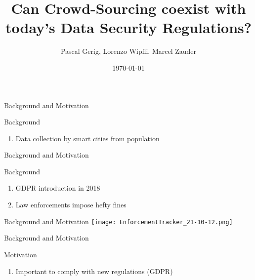 \documentclass{beamer}
\begin{document}
	\author{Pascal Gerig, Lorenzo Wipfli, Marcel Zauder}
	\title{Can Crowd-Sourcing coexist with today's Data Security Regulations?}
	\date{\today}

\begin{frame}
	\titlepage
\end{frame}



\begin{frame}{Background and Motivation}
	\begin{block}{Background}
		\begin{enumerate}[]
			\item Data collection by smart cities from population
		\end{enumerate}
	\end{block}
\end{frame}

\begin{frame}{Background and Motivation}
	\begin{block}{Background}
		\begin{enumerate}[]
			\item GDPR introduction in 2018
			\item Law enforcements impose hefty fines
		\end{enumerate}
	\end{block}
\end{frame}

\begin{frame}{Background and Motivation}
	\texttt{[image: EnforcementTracker\_21-10-12.png]}
\end{frame}

\begin{frame}{Background and Motivation}
	\begin{block}{Motivation}
		\begin{enumerate}[]
			\item Important to comply with new regulations (GDPR)
		\end{enumerate}
	\end{block}
\end{frame}
\end{document}
